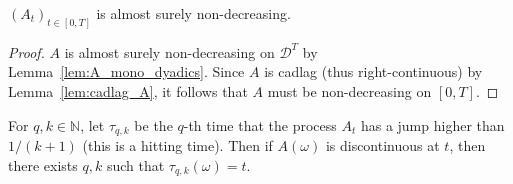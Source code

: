 


\begin{lemma}\label{lem:A_increasing}
  $(A_t)_{t\in[0,T]}$ is almost surely non-decreasing.
\end{lemma}

\begin{proof}
$A$ is almost surely non-decreasing on $\mathcal{D}^T$ by Lemma~\ref{lem:A_mono_dyadics}.
Since $A$ is cadlag (thus right-continuous) by Lemma~\ref{lem:cadlag_A}, it follows that $A$ must be non-decreasing on $[0,T]$.
\end{proof}


\begin{lemma}\label{lem:jump_A}
For $q,k \in \mathbb{N}$, let $\tau_{q, k}$ be the $q$-th time that the process $A_t$ has a jump higher than $1/(k+1)$ (this is a hitting time).
Then if $A(\omega)$ is discontinuous at $t$, then there exists $q,k$ such that $\tau_{q, k}(\omega) = t$.
\end{lemma}

